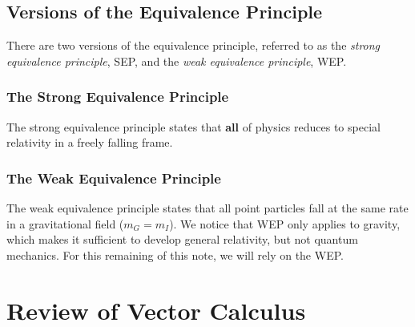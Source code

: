 \documentclass{book}
\theoremstyle{definition}
\begin{document}
\section{Versions of the Equivalence Principle}
There are two versions of the equivalence principle, referred to as the \textit{strong equivalence principle}, SEP, and the \textit{weak equivalence principle}, WEP. 
\subsection{The Strong Equivalence Principle}
The strong equivalence principle states that \textbf{all} of physics reduces to special relativity in a freely falling frame.
\subsection{The Weak Equivalence Principle}
The weak equivalence principle states that all point particles fall at the same rate in a gravitational field ($m_G = m_I$). We notice that WEP only applies to gravity, which makes it sufficient to develop general relativity, but not quantum mechanics. For this remaining of this note, we will rely on the WEP. 

\newpage

\chapter{Review of Vector Calculus}
\end{document}
